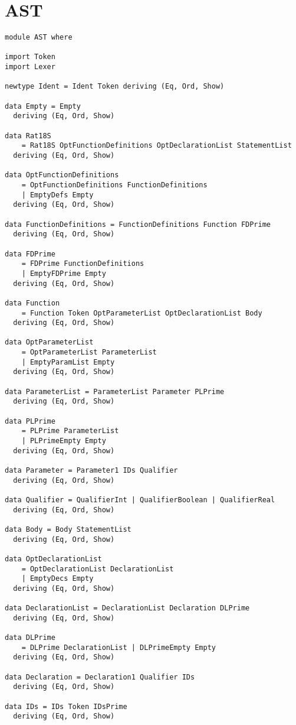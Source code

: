 \documentclass[11pt]{article}
\begin{document}
\section*{AST}
\label{sec-2}
\begin{verbatim}
module AST where

import Token
import Lexer

newtype Ident = Ident Token deriving (Eq, Ord, Show)

data Empty = Empty
  deriving (Eq, Ord, Show)

data Rat18S
    = Rat18S OptFunctionDefinitions OptDeclarationList StatementList
  deriving (Eq, Ord, Show)

data OptFunctionDefinitions
    = OptFunctionDefinitions FunctionDefinitions
    | EmptyDefs Empty
  deriving (Eq, Ord, Show)

data FunctionDefinitions = FunctionDefinitions Function FDPrime
  deriving (Eq, Ord, Show)

data FDPrime
    = FDPrime FunctionDefinitions
    | EmptyFDPrime Empty
  deriving (Eq, Ord, Show)

data Function
    = Function Token OptParameterList OptDeclarationList Body
  deriving (Eq, Ord, Show)

data OptParameterList
    = OptParameterList ParameterList
    | EmptyParamList Empty
  deriving (Eq, Ord, Show)

data ParameterList = ParameterList Parameter PLPrime
  deriving (Eq, Ord, Show)

data PLPrime
    = PLPrime ParameterList
    | PLPrimeEmpty Empty
  deriving (Eq, Ord, Show)

data Parameter = Parameter1 IDs Qualifier
  deriving (Eq, Ord, Show)

data Qualifier = QualifierInt | QualifierBoolean | QualifierReal
  deriving (Eq, Ord, Show)

data Body = Body StatementList
  deriving (Eq, Ord, Show)

data OptDeclarationList
    = OptDeclarationList DeclarationList
    | EmptyDecs Empty
  deriving (Eq, Ord, Show)

data DeclarationList = DeclarationList Declaration DLPrime
  deriving (Eq, Ord, Show)

data DLPrime
    = DLPrime DeclarationList | DLPrimeEmpty Empty
  deriving (Eq, Ord, Show)

data Declaration = Declaration1 Qualifier IDs
  deriving (Eq, Ord, Show)

data IDs = IDs Token IDsPrime
  deriving (Eq, Ord, Show)


\end{verbatim}
\end{document}

